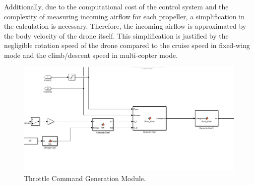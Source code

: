 Additionally, due to the computational cost of the control system and the complexity of measuring incoming airflow for each propeller, a simplification in the calculation is necessary. Therefore, the incoming airflow is approximated by the body velocity of the drone itself. This simplification is justified by the negligible rotation speed of the drone compared to the cruise speed in fixed-wing mode and the climb/descent speed in multi-copter mode.

\begin{figure}
    \centering
    \includegraphics[width=0.9\linewidth]{Images/throttle command generation block.png}
    \caption{Throttle Command Generation Module.}
    \label{fig:Throttle Command Generation Module}
\end{figure}
